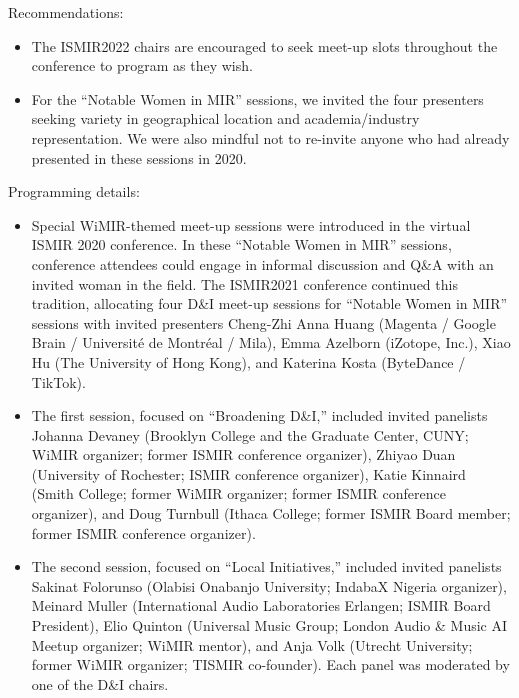 \documentclass[%
10pt,								%
titlepage,						%
]
{scrartcl}
\begin{document}
                Recommendations:
                \begin{itemize}
                    \item   The ISMIR2022 chairs are encouraged to seek meet-up slots throughout the conference to program as they wish.
                    \item   For the ``Notable Women in MIR'' sessions, we invited the four presenters seeking variety in geographical location and academia/industry representation. We were also mindful not to re-invite anyone who had already presented in these sessions in 2020.
                \end{itemize}

                Programming details:
                \begin{itemize}
                    \item   Special WiMIR-themed meet-up sessions were introduced in the virtual ISMIR 2020 conference. In these ``Notable Women in MIR'' sessions, conference attendees could engage in informal discussion and Q\&A with an invited woman in the field. The ISMIR2021 conference continued this tradition, allocating four D\&I meet-up sessions for ``Notable Women in MIR'' sessions with invited presenters Cheng-Zhi Anna Huang (Magenta / Google Brain / Universit\'e de Montr\'eal / Mila), Emma Azelborn (iZotope, Inc.), Xiao Hu (The University of Hong Kong), and Katerina Kosta (ByteDance / TikTok).
                    \item   The first session, focused on ``Broadening D\&I,'' included invited panelists Johanna Devaney (Brooklyn College and the Graduate Center, CUNY; WiMIR organizer; former ISMIR conference organizer), Zhiyao Duan (University of Rochester; ISMIR conference organizer), Katie Kinnaird (Smith College; former WiMIR organizer; former ISMIR conference organizer), and Doug Turnbull (Ithaca College; former ISMIR Board member; former ISMIR conference organizer). 
                    \item   The second session, focused on ``Local Initiatives,'' included invited panelists Sakinat Folorunso (Olabisi Onabanjo University; IndabaX Nigeria organizer), Meinard Muller (International Audio Laboratories Erlangen; ISMIR Board President), Elio Quinton (Universal Music Group; London Audio \& Music AI Meetup organizer; WiMIR mentor), and Anja Volk (Utrecht University; former WiMIR organizer; TISMIR co-founder). Each panel was moderated by one of the D\&I chairs.

                \end{itemize}
\end{document}
